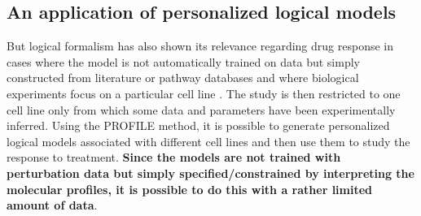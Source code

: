 \documentclass[a4paper,12pt,twoside,onecolumn,openright,final,oldfontcommands]{memoir}
\begin{document}
\subsection{An application of personalized logical
models}\label{an-application-of-personalized-logical-models}

But logical formalism has also shown its relevance regarding drug
response in cases where the model is not automatically trained on data
but simply constructed from literature or pathway databases and where
biological experiments focus on a particular cell line
\citep{flobak2015discovery}. The study is then restricted to one cell
line only from which some data and parameters have been experimentally
inferred. Using the PROFILE method, it is possible to generate
personalized logical models associated with different cell lines and
then use them to study the response to treatment. \textbf{Since the
models are not trained with perturbation data but simply
specified/constrained by interpreting the molecular profiles, it is
possible to do this with a rather limited amount of data}.
\end{document}
